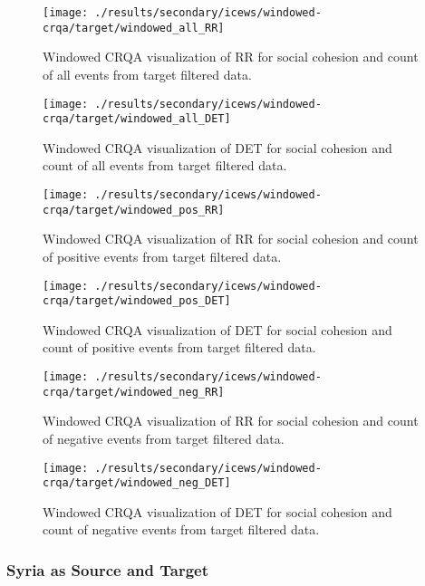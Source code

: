 \documentclass[english,man]{apa6}
\begin{document}
\begin{figure}
\texttt{[image: ./results/secondary/icews/windowed-crqa/target/windowed\_all\_RR]} \caption{Windowed CRQA visualization of RR for social cohesion and count of all events from target filtered data.}\label{fig:plot-RR-targ-all-secondary-icews}
\end{figure}

\begin{figure}
\texttt{[image: ./results/secondary/icews/windowed-crqa/target/windowed\_all\_DET]} \caption{Windowed CRQA visualization of DET for social cohesion and count of all events from target filtered data.}\label{fig:plot-DET-targ-all-secondary-icews}
\end{figure}

\begin{figure}
\texttt{[image: ./results/secondary/icews/windowed-crqa/target/windowed\_pos\_RR]} \caption{Windowed CRQA visualization of RR for social cohesion and count of positive events from target filtered data.}\label{fig:plot-RR-targ-pos-secondary-icews}
\end{figure}

\begin{figure}
\texttt{[image: ./results/secondary/icews/windowed-crqa/target/windowed\_pos\_DET]} \caption{Windowed CRQA visualization of DET for social cohesion and count of positive events from target filtered data.}\label{fig:plot-DET-targ-pos-secondary-icews}
\end{figure}

\begin{figure}
\texttt{[image: ./results/secondary/icews/windowed-crqa/target/windowed\_neg\_RR]} \caption{Windowed CRQA visualization of RR for social cohesion and count of negative events from target filtered data.}\label{fig:plot-RR-targ-neg-secondary-icews}
\end{figure}

\begin{figure}
\texttt{[image: ./results/secondary/icews/windowed-crqa/target/windowed\_neg\_DET]} \caption{Windowed CRQA visualization of DET for social cohesion and count of negative events from target filtered data.}\label{fig:plot-DET-targ-neg-secondary-icews}
\end{figure}

\hypertarget{syria-as-source-and-target-5}{%
\subsubsection{Syria as Source and Target}\label{syria-as-source-and-target-5}}
\end{document}
